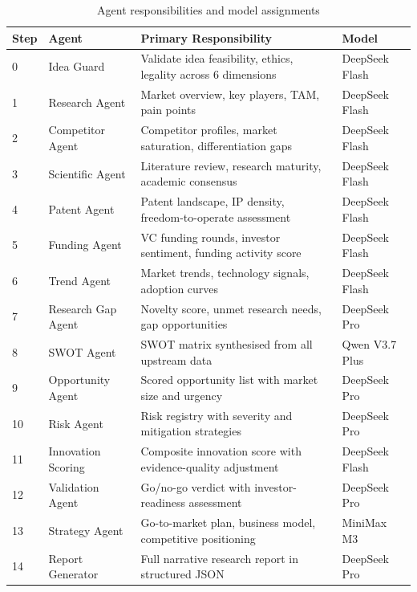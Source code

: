 \documentclass[12pt,a4paper,oneside]{book}
\begin{document}
\begin{table}[H]
\centering
\caption{Agent responsibilities and model assignments}
\label{tab:agents}
\begin{tabularx}{\textwidth}{llXl}
\toprule
\textbf{Step} & \textbf{Agent} & \textbf{Primary Responsibility} & \textbf{Model} \\
\midrule
0  & Idea Guard          & Validate idea feasibility, ethics, legality across 6 dimensions & DeepSeek Flash \\
1  & Research Agent      & Market overview, key players, TAM, pain points                 & DeepSeek Flash \\
2  & Competitor Agent    & Competitor profiles, market saturation, differentiation gaps    & DeepSeek Flash \\
3  & Scientific Agent    & Literature review, research maturity, academic consensus       & DeepSeek Flash \\
4  & Patent Agent        & Patent landscape, IP density, freedom-to-operate assessment    & DeepSeek Flash \\
5  & Funding Agent       & VC funding rounds, investor sentiment, funding activity score  & DeepSeek Flash \\
6  & Trend Agent         & Market trends, technology signals, adoption curves             & DeepSeek Flash \\
7  & Research Gap Agent  & Novelty score, unmet research needs, gap opportunities         & DeepSeek Pro   \\
8  & SWOT Agent          & SWOT matrix synthesised from all upstream data                 & Qwen V3.7 Plus \\
9  & Opportunity Agent   & Scored opportunity list with market size and urgency           & DeepSeek Pro   \\
10 & Risk Agent          & Risk registry with severity and mitigation strategies          & DeepSeek Pro   \\
11 & Innovation Scoring  & Composite innovation score with evidence-quality adjustment    & DeepSeek Flash \\
12 & Validation Agent    & Go/no-go verdict with investor-readiness assessment            & DeepSeek Pro   \\
13 & Strategy Agent      & Go-to-market plan, business model, competitive positioning     & MiniMax M3     \\
14 & Report Generator    & Full narrative research report in structured JSON              & DeepSeek Pro   \\
\bottomrule
\end{tabularx}
\end{table}
\end{document}
